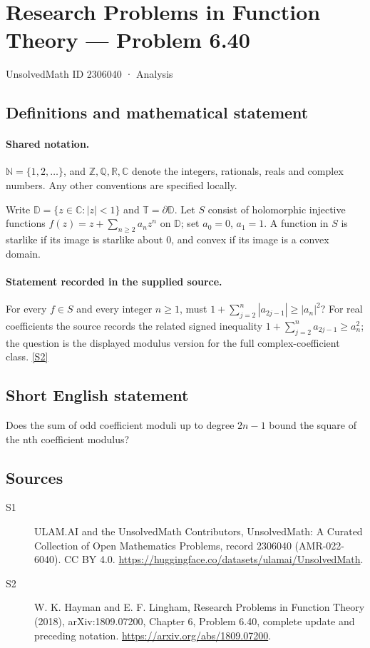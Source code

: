 \documentclass[11pt]{article}
\newcommand{\sref}[2]{\hyperlink{source:#1:#2}{[S#2]}}
\begin{document}
\setcounter{section}{2306039}
\section{Research Problems in Function Theory — Problem 6.40}\label{2306040}
{\small\sffamily UnsolvedMath ID 2306040 · Analysis}
\subsection{Definitions and mathematical statement}

\paragraph{Shared notation.}$\mathbb N=\{1,2,\ldots\}$, and $\mathbb Z,\mathbb Q,\mathbb R,\mathbb C$ denote the integers, rationals, reals and complex numbers. Any other conventions are specified locally.


Write $\mathbb D=\{z\in\mathbb C:|z|<1\}$ and $\mathbb T=\partial\mathbb D$. Let $S$ consist of holomorphic injective functions $f(z)=z+\sum_{n\ge2}a_nz^n$ on $\mathbb D$; set $a_0=0$, $a_1=1$. A function in $S$ is starlike if its image is starlike about $0$, and convex if its image is a convex domain.
\paragraph{Statement recorded in the supplied source.}
For every $f\in S$ and every integer $n\ge1$, must $1+\sum_{j=2}^{n}|a_{2j-1}|\ge|a_n|^2$? For real coefficients the source records the related signed inequality $1+\sum_{j=2}^{n}a_{2j-1}\ge a_n^2$; the question is the displayed modulus version for the full complex-coefficient class. \sref{2306040}{2}
\subsection{Short English statement}
Does the sum of odd coefficient moduli up to degree $2n-1$ bound the square of the nth coefficient modulus?
\subsection{Sources}
\begin{description}
\item[\hypertarget{source:2306040:1}{S1}] ULAM.AI and the UnsolvedMath Contributors, UnsolvedMath: A Curated Collection of Open Mathematics Problems, record 2306040 (AMR-022-6040). CC BY 4.0. \url{https://huggingface.co/datasets/ulamai/UnsolvedMath}.
\item[\hypertarget{source:2306040:2}{S2}] W. K. Hayman and E. F. Lingham, Research Problems in Function Theory (2018), arXiv:1809.07200, Chapter 6, Problem 6.40, complete update and preceding notation. \url{https://arxiv.org/abs/1809.07200}.
\end{description}
\label{end:2306040}
\end{document}

